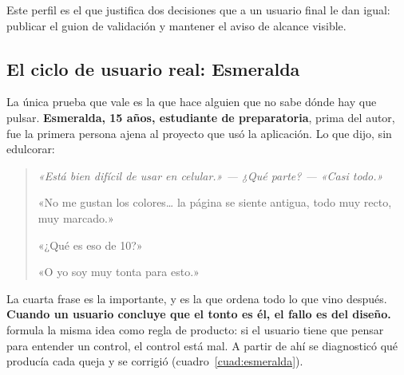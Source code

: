 \documentclass[11pt,a4paper]{article}
\begin{document}
Este perfil es el que justifica dos decisiones que a un usuario final le dan igual:
publicar el guion de validación y mantener el aviso de alcance visible.

\subsection{El ciclo de usuario real: Esmeralda}
\label{sec:esmeralda}

La única prueba que vale es la que hace alguien que no sabe dónde hay que pulsar.
\textbf{Esmeralda, 15 años, estudiante de preparatoria}, prima del autor, fue la primera
persona ajena al proyecto que usó la aplicación. Lo que dijo, sin edulcorar:

\begin{quote}\itshape
«Está bien difícil de usar en celular.» — ¿Qué parte? — «Casi todo.»\par\medskip
«No me gustan los colores\dots{} la página se siente antigua, todo muy recto, muy
marcado.»\par\medskip
«¿Qué es eso de 10?»\par\medskip
«O yo soy muy tonta para esto.»
\end{quote}

La cuarta frase es la importante, y es la que ordena todo lo que vino después.
\textbf{Cuando un usuario concluye que el tonto es él, el fallo es del diseño.}
\textcite{krug2014dont} formula la misma idea como regla de producto: si el usuario
tiene que pensar para entender un control, el control está mal. A partir de ahí se
diagnosticó qué producía cada queja y se corrigió (cuadro~\ref{cuad:esmeralda}).
\end{document}

